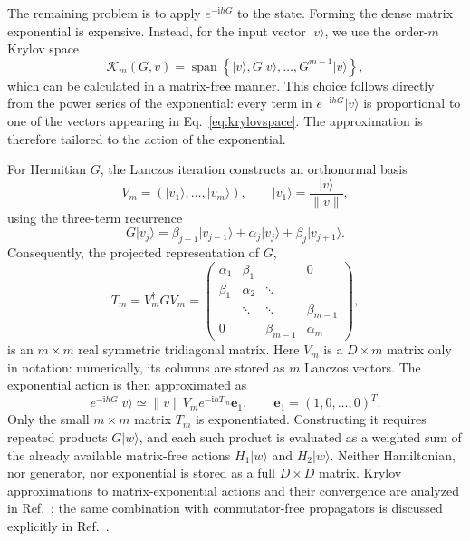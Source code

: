 \documentclass[a4paper,11pt]{article}
\newcommand{\ii}{\mathrm{i}}
\theoremstyle{remark}
\theoremstyle{theorem}
\begin{document}
The remaining problem is to apply $e^{-\ii hG}$ to the state. Forming the dense matrix exponential is expensive.
Instead, for the input vector $\vert v\rangle$, we use the order-$m$ Krylov space
\begin{equation}
\mathcal K_m(G,v)=\operatorname{span}\left\{
\vert v\rangle,G\vert v\rangle,\ldots,G^{m-1}\vert v\rangle
\right\},
\label{eq:krylovspace}
\end{equation}
which can be calculated in a matrix-free manner. 
This choice follows directly from the power series of the exponential: every term in $e^{-\ii hG}\vert v\rangle$ is proportional to one of the vectors appearing in Eq.~\eqref{eq:krylovspace}.  The approximation is therefore tailored to the action of the exponential.

For Hermitian $G$, the Lanczos iteration constructs an orthonormal basis
\begin{equation*}
V_m=(\vert v_1\rangle,\ldots,\vert v_m\rangle),
\qquad
\vert v_1\rangle=\frac{\vert v\rangle}{\lVert v\rVert},
\end{equation*}
using the three-term recurrence \cite{Lanczos1950}
\begin{equation}
G\vert v_j\rangle
=\beta_{j-1}\vert v_{j-1}\rangle
+\alpha_j\vert v_j\rangle
+\beta_j\vert v_{j+1}\rangle.
\label{eq:lanczosrecurrence}
\end{equation}
Consequently, the projected representation of $G$,
\begin{equation}
T_m=V_m^\dagger G V_m
=
\begin{pmatrix}
\alpha_1&\beta_1&&0\\
\beta_1&\alpha_2&\ddots&\\
&\ddots&\ddots&\beta_{m-1}\\
0&&\beta_{m-1}&\alpha_m
\end{pmatrix},
\label{eq:tridiagonal}
\end{equation}
is an $m\times m$ real symmetric tridiagonal matrix.  Here $V_m$ is a $D\times m$ matrix only in notation: numerically, its columns are stored as $m$ Lanczos vectors.
The exponential action is then approximated as \cite{HochbruckLubich1997}
\begin{equation}
e^{-\ii hG}\vert v\rangle
\simeq
\lVert v\rVert V_m e^{-\ii hT_m}\bm e_1,
\qquad
\bm e_1=(1,0,\ldots,0)^T.
\label{eq:krylovexp}
\end{equation}
Only the small $m\times m$ matrix $T_m$ is exponentiated.  Constructing it requires repeated products $G\vert w\rangle$, and each such product is evaluated as a weighted sum of the already available matrix-free actions $H_1\vert w\rangle$ and $H_2\vert w\rangle$.  Neither Hamiltonian, nor generator, nor exponential is stored as a full $D\times D$ matrix.  Krylov approximations to matrix-exponential actions and their convergence are analyzed in Ref.~\cite{HochbruckLubich1997}; the same combination with commutator-free propagators is discussed explicitly in Ref.~\cite{AlvermannFehske2011}.
\end{document}
